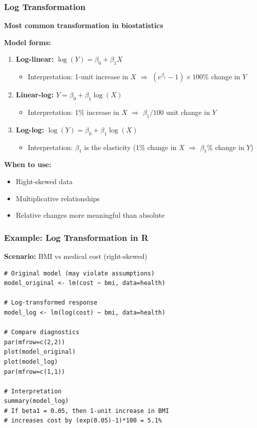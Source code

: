 \documentclass{beamer}
\begin{document}
\begin{frame}
\frametitle{Log Transformation}
\textbf{Most common transformation in biostatistics}

\vspace{0.3cm}
\textbf{Model forms:}
\begin{enumerate}
\item \textbf{Log-linear:} $\log(Y) = \beta_0 + \beta_1 X$
  \begin{itemize}
  \item Interpretation: 1-unit increase in $X$ $\Rightarrow$ $(e^{\beta_1} - 1) \times 100\%$ change in $Y$
  \end{itemize}

\item \textbf{Linear-log:} $Y = \beta_0 + \beta_1 \log(X)$
  \begin{itemize}
  \item Interpretation: 1\% increase in $X$ $\Rightarrow$ $\beta_1/100$ unit change in $Y$
  \end{itemize}

\item \textbf{Log-log:} $\log(Y) = \beta_0 + \beta_1 \log(X)$
  \begin{itemize}
  \item Interpretation: $\beta_1$ is the elasticity (1\% change in $X$ $\Rightarrow$ $\beta_1\%$ change in $Y$)
  \end{itemize}
\end{enumerate}

\vspace{0.3cm}
\textbf{When to use:}
\begin{itemize}
\item Right-skewed data
\item Multiplicative relationships
\item Relative changes more meaningful than absolute
\end{itemize}
\end{frame}

\begin{frame}[fragile]
\frametitle{Example: Log Transformation in R}
\textbf{Scenario:} BMI vs medical cost (right-skewed)

\small
\begin{verbatim}
# Original model (may violate assumptions)
model_original <- lm(cost ~ bmi, data=health)

# Log-transformed response
model_log <- lm(log(cost) ~ bmi, data=health)

# Compare diagnostics
par(mfrow=c(2,2))
plot(model_original)
plot(model_log)
par(mfrow=c(1,1))

# Interpretation
summary(model_log)
# If beta1 = 0.05, then 1-unit increase in BMI
# increases cost by (exp(0.05)-1)*100 = 5.1%
\end{verbatim}
\end{frame}
\end{document}
